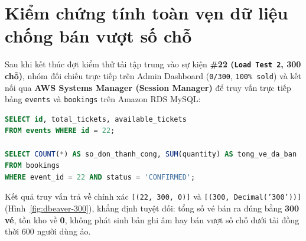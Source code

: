 

\section{Kiểm chứng tính toàn vẹn dữ liệu chống bán vượt số chỗ}
Sau khi kết thúc đợt kiểm thử tải tập trung vào sự kiện \textbf{\#22 (\texttt{Load Test 2}, 300 chỗ)}, nhóm đối chiếu trực tiếp trên Admin Dashboard (\texttt{0/300}, \texttt{100\% sold}) và kết nối qua \textbf{AWS Systems Manager (Session Manager)} để truy vấn trực tiếp bảng \texttt{events} và \texttt{bookings} trên Amazon RDS MySQL:

\noindent\begin{minipage}{\textwidth}
\begin{lstlisting}[language=SQL, caption={Truy vấn kiểm chứng tính toàn vẹn tồn kho sự kiện \#22 trên RDS MySQL}]
SELECT id, total_tickets, available_tickets
FROM events WHERE id = 22;

SELECT COUNT(*) AS so_don_thanh_cong, SUM(quantity) AS tong_ve_da_ban
FROM bookings
WHERE event_id = 22 AND status = 'CONFIRMED';
\end{lstlisting}
\end{minipage}

Kết quả truy vấn trả về chính xác \texttt{[(22, 300, 0)]} và \texttt{[(300, Decimal('300'))]} (Hình~\ref{fig:dbeaver-300}), khẳng định tuyệt đối: tổng số vé bán ra đúng bằng \textbf{300 vé}, tồn kho về \textbf{0}, không phát sinh bản ghi âm hay bán vượt số chỗ dưới tải đồng thời 600 người dùng ảo.

